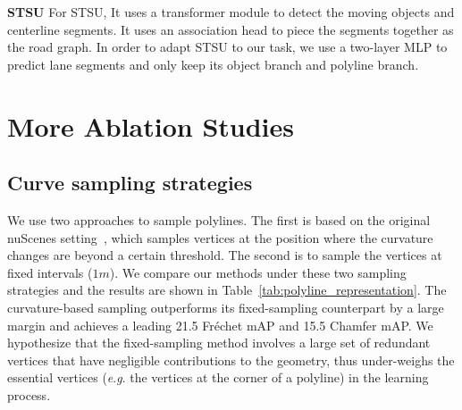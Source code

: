 \documentclass{article}
\newcommand{\ra}[1]{\renewcommand{\arraystretch}{#1}}
\newcommand{\eg}{\textit{e}.\textit{g}. }
\theoremstyle{plain}
\theoremstyle{definition}
\theoremstyle{remark}
\begin{document}
\noindent\textbf{STSU}
For STSU, It uses a transformer module to detect the moving objects and centerline segments. It uses an association head to piece the segments together as the road graph. In order to adapt STSU to our task, we use a two-layer MLP to predict lane segments and only keep its object branch and polyline branch. 


\section{More Ablation Studies}
\label{sec:more_ablations}
\subsection{Curve sampling strategies}
\begin{table}[h] \centering
    \ra{1.3}
    \caption{ 
        Ablation study of curves sampling strategies.
    }
\label{tab:polyline_representation}
\end{table} We use two approaches to sample polylines. The first is based on the original nuScenes setting~\citep{caesar2020nuscenes}, which samples vertices at the position where the curvature changes are beyond a certain threshold. The second is to sample the vertices at fixed intervals ($1m$). We compare our methods under these two sampling strategies and the results are shown in Table~\ref{tab:polyline_representation}.
The curvature-based sampling outperforms its fixed-sampling counterpart by a large margin and achieves a leading 21.5 Fr\'echet mAP and 15.5 Chamfer mAP. We hypothesize that the fixed-sampling method involves a large set of redundant vertices that have negligible contributions to the geometry, thus under-weighs the essential vertices (\eg the vertices at the corner of a polyline) in the learning process.
\end{document}

